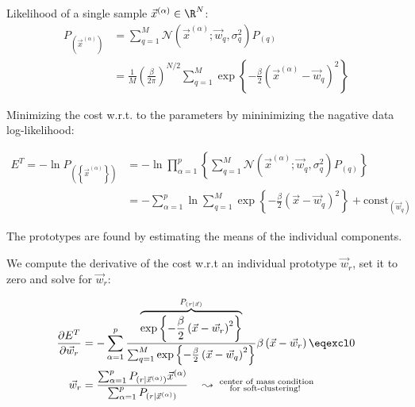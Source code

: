 \begin{frame}{\subsecname}


Likelihood of a single sample $\vec x^{(\alpha)} \in \R^N$:
\begin{align}
P_{(\vec{x}^{(\alpha)})} &= \sum_{q=1}^{M} \mathcal{N}\left( \vec{x}^{(\alpha)}; \vec{w}_q, \sigma_q^2 \right) P_{(q)} \\
&= \frac{1}{M}\left(\frac{\beta}{2\pi}\right)^{N/2} \sum_{q=1}^{M} \exp \left\{ - \frac{\beta}{2} \left( \vec{x}^{(\alpha)} - \vec{w}_q \right)^2 \right\} 
\end{align}

Minimizing the cost w.r.t. to the parameters by mininimizing the nagative data log-likelihood:

\begin{align}
E^T = - \ln P_{\left( \left\{ \vec{x}^{(\alpha)} \right\} \right)} &= -\ln \prod_{\alpha=1}^{p} \left\{ \sum_{q=1}^{M} \mathcal{N}\left( \vec{x}^{(\alpha)}; \vec{w}_q, \sigma_q^2 \right) P_{(q)} \right\} 
\\&= - \sum_{\alpha=1}^{p} \ln \sum_{q=1}^{M} \exp \left\{ - \frac{\beta}{2} \left( \vec{x} - \vec{w}_q \right)^2 \right\} + \text{const}_{(\vec{w}_q)}
\end{align}

\end{frame}

\begin{frame}{\subsecname}

The prototypes are found by estimating the means of the individual components.

We compute the derivative of the cost w.r.t an individual prototype $\vec w_r$, set it to zero and solve for $\vec w_r$:

\begin{align}
\frac{\partial E^T}{\partial \vec{w}_r} &= - \sum_{\alpha=1}^{p} \frac{\overbrace{\exp \left\{ - \frac{\beta}{2} \left( \vec{x} - \vec{w}_r \right)^2 \right\}}^{P_{(r|\vec x)}}}{\sum_{q=1}^{M} \exp \left\{ - \frac{\beta}{2} \left( \vec{x} - \vec{w}_q \right)^2 \right\}} \beta \left( \vec{x} - \vec{w}_r \right) \eqexcl 0 \\
\vec{w}_r &= \frac{\sum_{\alpha=1}^{p} P_{(r | \vec{x}^{(\alpha)})} \vec{x}^{(\alpha)}}{\sum_{\alpha=1}^{p} P_{(r | \vec{x}^{(\alpha)})}} \quad \leadsto \substack{\text{ center of mass condition}\\\text{for soft-clustering!}}
\end{align}

\end{frame}

